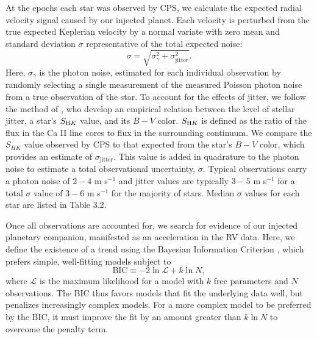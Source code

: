 At the epochs each star was observed by CPS, we calculate the expected radial velocity signal caused by our injected planet. Each velocity is perturbed from the true expected Keplerian velocity by a normal variate with zero mean and standard deviation $\sigma$ representative of the total expected noise:
\begin{equation}
\sigma = \sqrt{\sigma_\gamma^2 + \sigma^2_\textrm{jitter}}.
\label{sigmaeq}
\end{equation}
Here, $\sigma_\gamma$ is the photon noise, estimated for each individual observation by randomly selecting a single measurement of the measured Poisson photon noise from a true observation of the star. To account for the effects of jitter, we follow the method of \citet{Isaacson10}, who develop an empirical relation between the level of stellar jitter, a star's $S_{\textrm HK}$ value, and its $B-V$ color. $S_{\textrm HK}$ is defined as the ratio of the flux in the Ca II line cores to flux in the surrounding continuum. We compare the $S_{HK}$ value observed by CPS to that expected from the star's $B-V$ color, which provides an estimate of $\sigma_\textrm{jitter}$. This value is added in quadrature to the photon noise to estimate a total observational uncertainty, $\sigma$. Typical observations carry a photon noise of $2-4$ m s$^{-1}$ and jitter values are typically $3-5$ m s$^{-1}$ for a total $\sigma$ value of $3-6$ m s$^{-1}$ for the majority of stars. Median $\sigma$ values for each star are listed in Table 3.2.

Once all observations are accounted for, we search for evidence of our injected planetary companion, manifested as an acceleration in the RV data. Here, we define the existence of a trend using the Bayesian Information Criterion \citep[BIC;][]{Schwarz78, Bowler10, Campo11, Stevenson12}, which prefers simple, well-fitting models subject to 
\begin{equation}
\textrm{BIC} \equiv -2 \ln \mathcal{L} + k \ln N,
\label{EqBIC}
\end{equation}  
where $\mathcal{L}$ is the maximum likelihood for a model with $k$ free parameters and $N$ observations. The BIC thus favors models that fit the underlying data well, but penalizes increasingly complex models. For a more complex model to be preferred by the BIC, it must improve the fit by an amount greater than $k \ln N$ to overcome the penalty term.

